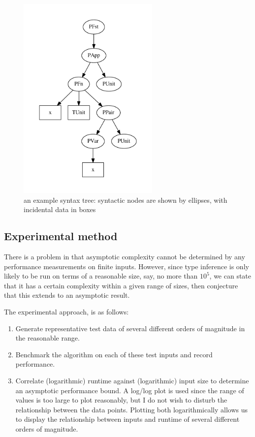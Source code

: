 \begin{figure}
\centering
\includegraphics[height=4in]{chapters/evaluation/figures/example-tree.pdf}
\caption{an example syntax tree: syntactic nodes are shown by ellipses, with incidental data in boxes}
\label{fig:example-tree}
\end{figure}

\subsection{Experimental method}
There is a problem in that asymptotic complexity cannot be determined by any performance measurements on finite inputs.
However, since type inference is only likely to be run on terms of a reasonable size, say, no more than \(10^5\), we can state that it has a certain complexity within a given range of sizes, then conjecture that this extends to an asymptotic result.

The experimental approach, is as follows:
\begin{enumerate}
\item
Generate representative test data of several different orders of magnitude in the reasonable range.
\item
Benchmark the algorithm on each of these test inputs and record performance.
\item
Correlate (logarithmic) runtime against (logarithmic) input size to determine an asymptotic performance bound.
A log/log plot is used since the range of values is too large to plot reasonably, but I do not wish to disturb the relationship between the data points.
Plotting both logarithmically allows us to display the relationship between inputs and runtime of several different orders of magnitude.
\end{enumerate}

